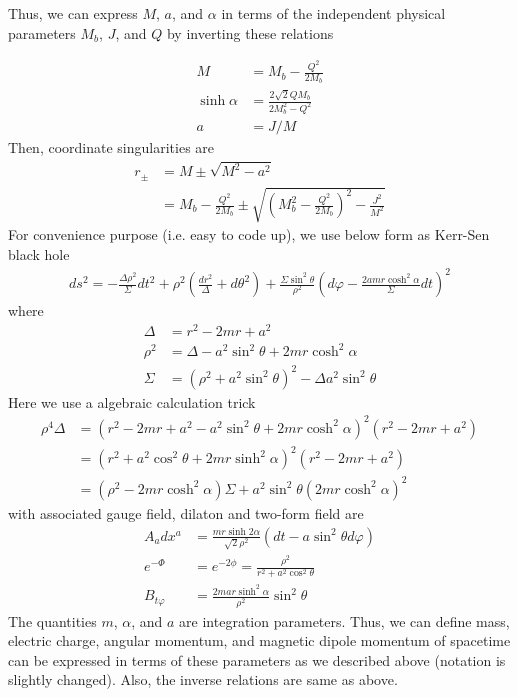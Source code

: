 \documentclass[prd]{revtex4}
\begin{document}
Thus, we can express $M$, $a$, and $\alpha$ in terms of the independent physical parameters $M_b$, $J$, and $Q$ by inverting these relations

\begin{align}
M &= M_b - \frac{Q^2}{2 M_b} \\
\sinh \alpha &= \frac{2 \sqrt{2} Q M_b}{2 M_b^2 - Q^2} \\
a &= J/M
\end{align}
Then, coordinate singularities are
\begin{align}
r_{\pm} &= M \pm \sqrt{M^2-a^2} \nonumber \\
	    &= M_b - \frac{Q^2}{2 M_b} \pm \sqrt{\left( M_b^2 - \frac{Q^2}{2 M_b} \right)^2 - \frac{J^2}{M^2}}
\end{align}
For convenience purpose (i.e. easy to code up), we use below form as Kerr-Sen black hole
\begin{align}
ds^2 = - \frac{\Delta \rho^2}{\Sigma} dt^2 + \rho^2 \left( \frac{dr^2}{\Delta} + d \theta^2 \right) + \frac{\Sigma \sin^2 \theta}{\rho^2} \left(d \varphi - \frac{2 a m r \cosh^2 \alpha}{\Sigma} dt \right)^2
\end{align}
where
\begin{align}
\Delta &=r^2 - 2mr + a^2 \\
\rho^2 &=\Delta - a^2 \sin^2 \theta + 2mr \cosh^2 \alpha \\
\Sigma &= (\rho^2 + a^2 \sin^2 \theta)^2 - \Delta a^2 \sin^2 \theta
\end{align}
Here we use a algebraic calculation trick
\begin{align}
\rho^4 \Delta &= (r^2 - 2mr + a^2 - a^2 \sin^2 \theta + 2mr \cosh^2 \alpha)^2 (r^2 - 2mr + a^2) \nonumber \\
		     &= (r^2 + a^2 \cos^2 \theta + 2 m r \sinh^2 \alpha)^2 (r^2 - 2mr + a^2) \nonumber \\
		     &=(\rho^2 - 2 m r \cosh^2 \alpha) \Sigma + a^2 \sin^2 \theta(2 m r \cosh^2 \alpha)^2
\end{align}
with associated gauge field, dilaton and two-form field are
\begin{align}
A_a dx^a &= \frac{m r \sinh 2 \alpha}{\sqrt{2} \rho^2} (dt - a \sin^2 \theta d \varphi) \\
e^{-\Phi} &= e^{-2 \phi} = \frac{\rho^2}{r^2 + a^2 \cos^2 \theta} \\
B_{t \varphi} &= \frac{2 m a r \sinh^2 \alpha}{\rho^2} \sin^2 \theta
\end{align}
The quantities $m$, $\alpha$, and $a$ are integration parameters. Thus, we can define mass, electric charge, angular momentum, and magnetic dipole momentum of spacetime can be expressed in terms of these parameters as we described above (notation is slightly changed). Also, the inverse relations are same as above.
\end{document}
